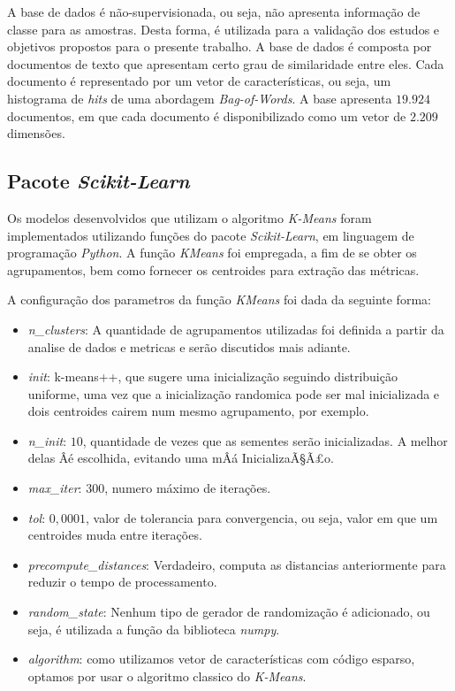\documentclass[conference]{IEEEtran}
\begin{document}
A base de dados é não-supervisionada, ou seja, não apresenta informação de classe para as amostras. Desta forma, é utilizada para a validação dos estudos e objetivos propostos para o presente trabalho. A base de dados é composta por documentos de texto que apresentam certo grau de similaridade entre eles. Cada documento é representado por um vetor de características, ou seja, um histograma de \emph{hits} de uma abordagem \emph{Bag-of-Words}. A base apresenta $19.924$ documentos, em que cada documento é disponibilizado como um vetor de $2.209$ dimensões.

\subsection{Pacote \textit{Scikit-Learn}} \label{sec:pac}

Os modelos desenvolvidos que utilizam o algoritmo \emph{K-Means} foram implementados utilizando funções do pacote \emph{Scikit-Learn}, em linguagem de programação \emph{Python}. A função \emph{KMeans} foi empregada, a fim de se obter os agrupamentos, bem como fornecer os centroides para extração das métricas.

A configuração dos parametros da função \emph{KMeans} foi dada da seguinte forma:
\begin{itemize}
	\footnotesize \item \textit{n\_clusters}: A quantidade de agrupamentos utilizadas foi definida a partir da analise de dados e metricas e serão discutidos mais adiante.
	\footnotesize \item \textit{init}: k-means++, que sugere uma inicialização seguindo distribuição uniforme, uma vez que a inicialização randomica pode ser mal inicializada e dois centroides cairem num mesmo agrupamento, por exemplo.
	\footnotesize \item \textit{n\_init}: $10$, quantidade de vezes que as sementes serão inicializadas. A melhor delas Âé escolhida, evitando uma mÂá InicializaÃ§Ã£o.
	\footnotesize \item \textit{max\_iter}: $300$, numero máximo de iterações.
	\footnotesize \item \textit{tol}: $0,0001$, valor de tolerancia para convergencia, ou seja, valor em que um centroides muda entre iterações.
	\footnotesize \item \textit{precompute\_distances}: Verdadeiro, computa as distancias anteriormente para reduzir o tempo de processamento.
	\footnotesize \item \textit{random\_state}: Nenhum tipo de gerador de randomização é adicionado, ou seja, é utilizada a função da biblioteca \emph{numpy}.
	\footnotesize \item \textit{algorithm}: como utilizamos vetor de características com código esparso, optamos por usar o algoritmo classico do \emph{K-Means}.
\end{itemize}
\end{document}
